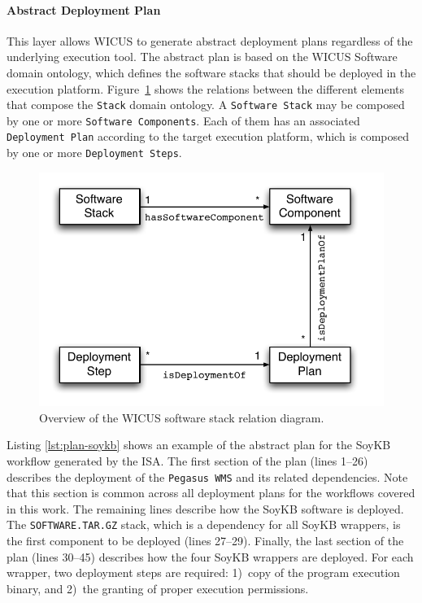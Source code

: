 \paragraph{\textbf{Abstract Deployment Plan}}
This layer allows WICUS to generate abstract deployment plans regardless of the
underlying execution tool. The abstract plan is based on the WICUS Software~\cite{wicus} 
domain ontology, which defines the software stacks that should be deployed in the 
execution platform. Figure~\ref{fig:stack-rel} shows the relations between the different
elements that compose the \texttt{Stack} domain ontology. A \texttt{Software Stack} may
be composed by one or more \texttt{Software Components}. Each of them has an associated 
\texttt{Deployment Plan} according to the target execution platform, which is composed by 
one or more \texttt{Deployment Steps}.

\begin{figure}[!b]
	\centering
	\includegraphics[width=0.9\linewidth]{figures/stack-rel}
	\caption{Overview of the WICUS software stack relation diagram.}
	\label{fig:stack-rel}
\end{figure}

Listing \ref{lst:plan-soykb} shows an example of the abstract plan for the SoyKB workflow generated by the ISA. 
The first section of the plan (lines 1--26) describes the deployment of the \texttt{Pegasus 
WMS} and its related dependencies. Note that this section is common across all deployment
plans for the workflows covered in this work. The remaining lines describe how the SoyKB 
software is deployed. The \texttt{SOFTWARE.TAR.GZ} stack, which is a dependency for all 
SoyKB wrappers, is the first component to be deployed (lines 27--29). Finally, the last section 
of the plan (lines 30--45) describes how the four SoyKB wrappers are deployed. For each
wrapper, two deployment steps are required: 1)~copy of the program execution binary, and
2)~the granting of proper execution permissions.

